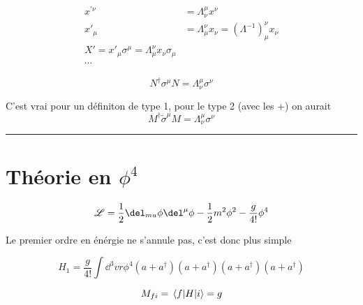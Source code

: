 \begin{align*}
	x^{\prime\nu} &= \Lambda_{\nu}^{\mu}x^{\nu}\\
	x'_\mu &= \Lambda_{\mu}^{\nu}x_{\nu} = (\Lambda ^{-1})_\mu^{\nu}x_{\nu} \\
	X' = x'_\mu \sigma^{\mu}=  \Lambda_{\mu}^{\nu}x_{\nu} \sigma_{\mu}\\
	\dotsb
\end{align*}

$$\boxed{N^{\dagger}\sigma^{\mu}N = \Lambda_{\nu}^{\mu}\sigma^\nu}$$ 


C'est vrai pour un définiton de type 1, pour le type 2 (avec les +) on aurait $$M^{\dagger}\tilde \sigma^{\mu}M = \Lambda_{\nu}^{\mu}\sigma^{\nu}$$ 

\hrule




\section*{Théorie en $\phi^{4}$ }

$$\mathscr{L} = \frac{1}{2} \del_{mu} \phi \del^{\mu}\phi - \frac{1}{2} m^{2}\phi^{2} - \frac{g}{4!} \phi^4$$ 


Le premier ordre en énérgie ne s'annule pas, c'est donc plus simple

$$H_1 = \frac{g}{4!}  \int \dd ^3 vr \phi^{4} \left( a + a^{\dagger} \right)\left( a + a^{\dagger} \right)\left( a + a^{\dagger} \right)\left( a + a^{\dagger} \right)  $$ 
 

$$M_{fi}  = \mel{f}{H}{i}= g$$ 


